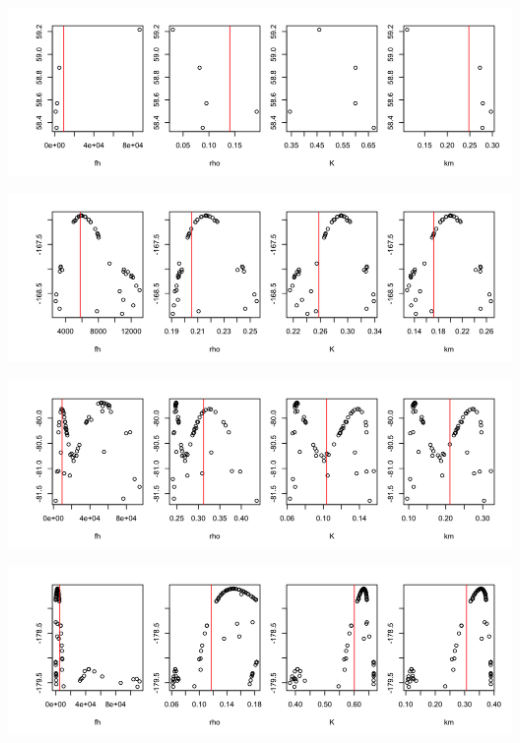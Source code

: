 \documentclass[12pt,reqno,final,pdftex]{amsart}\usepackage[]{graphicx}\usepackage[]{color}
\newenvironment{knitrout}{}{} %
\theoremstyle{plain}
\numberwithin{equation}{part}
\begin{document}
\begin{knitrout}\scriptsize
{}\color{fgcolor}

\includegraphics[width=\linewidth]{figure/unnamed-chunk-4-1} \hfill{}




\includegraphics[width=\linewidth]{figure/unnamed-chunk-4-2} \hfill{}




\includegraphics[width=\linewidth]{figure/unnamed-chunk-4-3} \hfill{}




\includegraphics[width=\linewidth]{figure/unnamed-chunk-4-4} \hfill{}





\end{knitrout}
\end{document}
